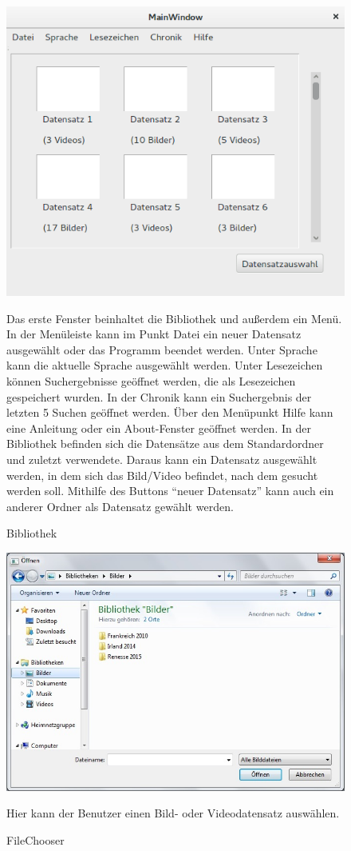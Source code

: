 \begin{figure}
\includegraphics[width=1\linewidth]{img/Bibliothek}
\caption{Bibliothek}
\label{fig:bibliothek}
\vspace{10pt}
Das erste Fenster beinhaltet die Bibliothek und außerdem ein Menü. In der Menüleiste kann im Punkt Datei ein neuer Datensatz ausgewählt oder das Programm beendet werden.  Unter Sprache kann die aktuelle Sprache ausgewählt werden. Unter Lesezeichen können Suchergebnisse geöffnet werden, die als Lesezeichen gespeichert wurden. In der Chronik kann ein Suchergebnis der letzten 5 Suchen geöffnet werden. Über den Menüpunkt Hilfe kann eine Anleitung oder ein About-Fenster geöffnet werden.
In der Bibliothek befinden sich die Datensätze aus dem Standardordner und zuletzt verwendete. Daraus kann ein Datensatz ausgewählt werden, in dem sich das Bild/Video befindet, nach dem gesucht werden soll. Mithilfe des Buttons \enquote{neuer Datensatz} kann auch ein anderer Ordner als Datensatz gewählt werden.
\end{figure}

\begin{figure}
\includegraphics[width=1\linewidth]{img/FileChooser}
\caption{FileChooser}
\label{fig:filechooser}
\vspace{10pt}
Hier kann der Benutzer einen Bild- oder Videodatensatz auswählen.
\end{figure}

